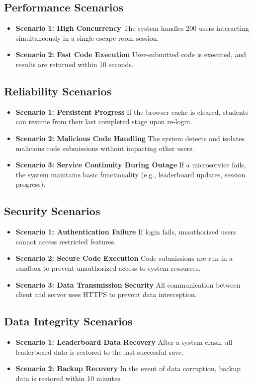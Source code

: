 \begin{itemize}
\subsection{Performance Scenarios}
\begin{itemize}
    \item \textbf{Scenario 1: High Concurrency}  
    The system handles 200 users interacting simultaneously in a single escape room session.
    \item \textbf{Scenario 2: Fast Code Execution}  
    User-submitted code is executed, and results are returned within 10 seconds.
\end{itemize}

\subsection{Reliability Scenarios}
\begin{itemize}
    \item \textbf{Scenario 1: Persistent Progress}  
    If the browser cache is cleared, students can resume from their last completed stage upon re-login.
    \item \textbf{Scenario 2: Malicious Code Handling}  
    The system detects and isolates malicious code submissions without impacting other users.
    \item \textbf{Scenario 3: Service Continuity During Outage}  
    If a microservice fails, the system maintains basic functionality (e.g., leaderboard updates, session progress).
\end{itemize}

\subsection{Security Scenarios}
\begin{itemize}
    \item \textbf{Scenario 1: Authentication Failure}  
    If login fails, unauthorized users cannot access restricted features.
    \item \textbf{Scenario 2: Secure Code Execution}  
    Code submissions are run in a sandbox to prevent unauthorized access to system resources.
    \item \textbf{Scenario 3: Data Transmission Security}  
    All communication between client and server uses HTTPS to prevent data interception.
\end{itemize}

\subsection{Data Integrity Scenarios}
\begin{itemize}
    \item \textbf{Scenario 1: Leaderboard Data Recovery}  
    After a system crash, all leaderboard data is restored to the last successful save.
    \item \textbf{Scenario 2: Backup Recovery}  
    In the event of data corruption, backup data is restored within 10 minutes.
\end{itemize}


\end{itemize}
